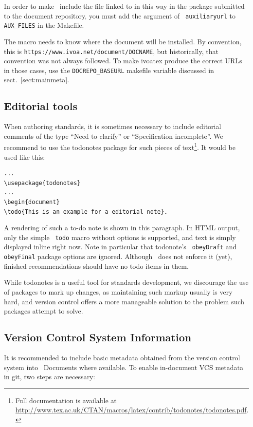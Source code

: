 \documentclass[11pt,a4paper]{ivoa}
\newcommand{\texword}[1]{\texttt{\color{texcolor} #1}}
\begin{document}
In order to make \ivoatex~include the file linked to in this way in the
package submitted to the document repository, you must add the argument
of \texword{auxiliaryurl} to \verb|AUX_FILES| in the Makefile.

The macro needs to know where the document will be installed.  By
convention, this is \nolinkurl{https://www.ivoa.net/document/DOCNAME},
but historically, that convention was not always followed.  To make
ivoatex produce the correct URLs in those cases, use the
\verb|DOCREPO_BASEURL| makefile variable discussed in
sect.~\ref{sect:mainmeta}.

\subsection{Editorial tools}

When authoring standards, it is sometimes necessary to include
editorial comments of the type ``Need to clarify'' or ``Specification
incomplete''.  We recommend to use the todonotes package for such
pieces of text\footnote{Full documentation is available at
\url{http://www.tex.ac.uk/CTAN/macros/latex/contrib/todonotes/todonotes.pdf}.}.
It would be used like this:
\begin{lstlisting}
...
\usepackage{todonotes}
...
\begin{document}
\todo{This is an example for a editorial note}.
\end{lstlisting}

A rendering of such a to-do note is shown in this
paragraph. In HTML output,
only the simple \texword{todo} macro without options is supported, and
text is simply displayed inline right now.  Note in particular that
todonote's \texword{obeyDraft} and \texword{obeyFinal} package options
are ignored.  Although \ivoatex\ does not enforce it (yet), finished
recommendations should have no todo items in them.

While todonotes is a useful tool for standards development, we
discourage the use of packages to mark up changes, as maintaining such
markup usually is very hard, and version control offers a more
manageable solution to the problem such packages attempt to solve.

\subsection{Version Control System Information}
\label{sect:vcs}

It is recommended to include basic metadata obtained from the version
control system into \ivoatex~Documents where available.
To enable in-document VCS metadata in git, two steps are necessary:
\end{document}

